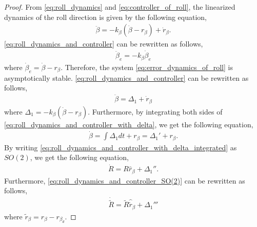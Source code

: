 \begin{proof}
    From \eqref{eq:roll_dynamics} and \eqref{eq:controller_of_roll}, the linearized dynamics of the roll direction is given by the following equation,
    \begin{align}
        \label{eq:roll_dynamics_and_controller}
        \ddot{\beta} = - k_{\beta} (\dot{\beta} - r_{\beta}) + \dot{r}_{\beta}.
    \end{align}
    \eqref{eq:roll_dynamics_and_controller} can be rewritten as follows,
    \begin{align}
        \label{eq:error_dynamics_of_roll}
        \ddot{\beta}_e = -k_{\beta} \dot{\beta}_e
    \end{align}
    where $ \dot{\beta}_e = \dot{\beta} - r_{\beta} $.
    Therefore, the system \eqref{eq:error_dynamics_of_roll} is asymptotically stable.
    \eqref{eq:roll_dynamics_and_controller} can be rewritten as follows,
    \begin{align}
        \label{eq:roll_dynamics_and_controller_with_delta}
        \ddot{\beta} = \Delta_1 + \dot{r}_{\beta}
    \end{align}
    where $ \Delta_1 = -k_{\beta} (\dot{\beta} - r_{\beta}) $.
    Furthermore, by integrating both sides of \eqref{eq:roll_dynamics_and_controller_with_delta}, we get the following equation,
    \begin{align}
    \label{eq:roll_dynamics_and_controller_with_delta_integrated}
        \dot{\beta} = \int \Delta_1 dt + r_{\beta} = \Delta_1' + r_{\beta}.
    \end{align}
    By writing \eqref{eq:roll_dynamics_and_controller_with_delta_integrated} as $ SO(2) $, we get the following equation,
    \begin{align}
        \label{eq:roll_dynamics_and_controller_SO(2)}
        \dot{R} = R \hat{r}_{\beta} + \Delta_1''.
    \end{align}
    Furthermore, \eqref{eq:roll_dynamics_and_controller_SO(2)} can be rewritten as follows,
    \begin{align}
        \label{eq:roll_dynamics_and_controller_SO(2)_error}
        \dot{\tilde{R}} = \tilde{R} \hat{\tilde{r}}_{\beta} + \Delta_1'''
    \end{align}
    where $ \tilde{r}_{\beta} = r_{\beta} - r_{\beta_d} $.
    

\end{proof}
